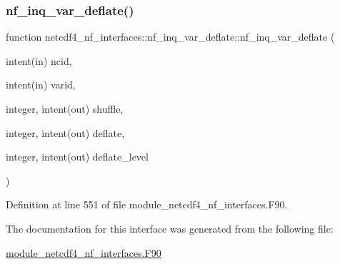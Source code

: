 \subsubsection{\texorpdfstring{nf\+\_\+inq\+\_\+var\+\_\+deflate()}{nf\_inq\_var\_deflate()}}
{\footnotesize\ttfamily function netcdf4\+\_\+nf\+\_\+interfaces\+::nf\+\_\+inq\+\_\+var\+\_\+deflate\+::nf\+\_\+inq\+\_\+var\+\_\+deflate (\begin{DoxyParamCaption}\item[{intent(in)}]{ncid,  }\item[{intent(in)}]{varid,  }\item[{integer, intent(out)}]{shuffle,  }\item[{integer, intent(out)}]{deflate,  }\item[{integer, intent(out)}]{deflate\+\_\+level }\end{DoxyParamCaption})}



Definition at line 551 of file module\+\_\+netcdf4\+\_\+nf\+\_\+interfaces.\+F90.



The documentation for this interface was generated from the following file\+:\begin{DoxyCompactItemize}
\item 
\hyperlink{module__netcdf4__nf__interfaces_8F90}{module\+\_\+netcdf4\+\_\+nf\+\_\+interfaces.\+F90}\end{DoxyCompactItemize}
